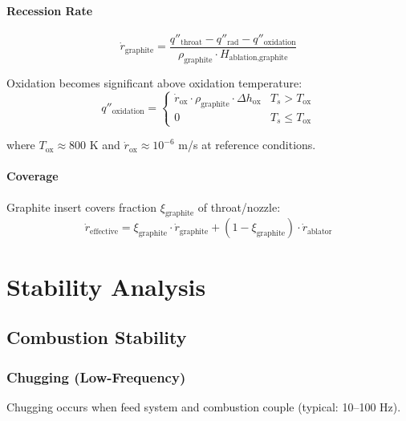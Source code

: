 \documentclass[12pt,a4paper]{article}
\begin{document}
\paragraph{Recession Rate}

\begin{equation}
\dot{r}_{\text{graphite}} = \frac{q''_{\text{throat}} - q''_{\text{rad}} - q''_{\text{oxidation}}}{\rho_{\text{graphite}} \cdot H_{\text{ablation,graphite}}}
\end{equation}

Oxidation becomes significant above oxidation temperature:
\begin{equation}
q''_{\text{oxidation}} = \begin{cases}
\dot{r}_{\text{ox}} \cdot \rho_{\text{graphite}} \cdot \Delta h_{\text{ox}} & T_s > T_{\text{ox}} \\
0 & T_s \leq T_{\text{ox}}
\end{cases}
\end{equation}

where $T_{\text{ox}} \approx 800$ K and $\dot{r}_{\text{ox}} \approx 10^{-6}$ m/s at reference conditions.

\paragraph{Coverage}

Graphite insert covers fraction $\xi_{\text{graphite}}$ of throat/nozzle:
\begin{equation}
\dot{r}_{\text{effective}} = \xi_{\text{graphite}} \cdot \dot{r}_{\text{graphite}} + (1 - \xi_{\text{graphite}}) \cdot \dot{r}_{\text{ablator}}
\end{equation}

\section{Stability Analysis}

\subsection{Combustion Stability}

\subsubsection{Chugging (Low-Frequency)}

Chugging occurs when feed system and combustion couple (typical: 10--100 Hz).
\end{document}
